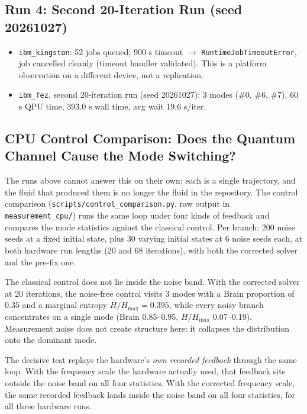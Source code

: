 \documentclass[sigconf,anonymous=false]{acmart}
\begin{document}
\subsection{Run 4: Second 20-Iteration Run (seed 20261027)}

\begin{itemize}
\item \texttt{ibm\_kingston}: 52 jobs queued, 900 s timeout $\to$ \texttt{RuntimeJobTimeoutError}, job cancelled cleanly (timeout handler validated). This is a platform observation on a different device, not a replication.
\item \texttt{ibm\_fez}, second 20-iteration run (seed 20261027): 3 modes (\#0, \#6, \#7), 60 s QPU time, 393.0 s wall time, avg wait 19.6 s/iter.
\end{itemize}

\subsection{CPU Control Comparison: Does the Quantum Channel Cause the Mode Switching?}
\label{sec:control}

The runs above cannot answer this on their own: each is a single trajectory, and the fluid
that produced them is no longer the fluid in the repository. The control comparison
(\texttt{scripts/control\_comparison.py}, raw output in \texttt{measurement\_cpu/}) runs the
same loop under four kinds of feedback and compares the mode statistics against the
classical control. Per branch: 200 noise seeds at a fixed initial state, plus 30 varying
initial states at 6 noise seeds each, at both hardware run lengths (20 and 68 iterations),
with both the corrected solver and the pre-fix one.

The classical control does not lie inside the noise band. With the corrected solver at 20
iterations, the noise-free control visits 3 modes with a Brain proportion of 0.35 and a
marginal entropy $H/H_{\max} = 0.395$, while every noisy branch concentrates on a single
mode (Brain 0.85--0.95, $H/H_{\max}$ 0.07--0.19). Measurement noise does not create
structure here: it collapses the distribution onto the dominant mode.

The decisive test replays the hardware's \emph{own recorded feedback} through the same loop.
With the frequency scale the hardware actually used, that feedback sits outside the noise
band on all four statistics. With the corrected frequency scale, the same recorded feedback
lands inside the noise band on all four statistics, for all three hardware runs.
\end{document}
